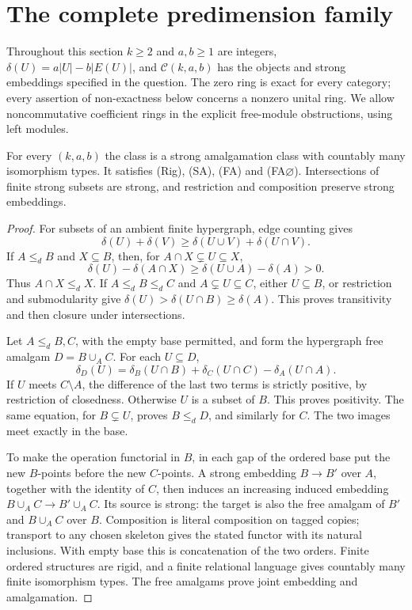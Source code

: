 \section{The complete predimension family}
\label{sec:D}
Throughout this section $k\geq2$ and $a,b\geq1$ are integers,
$\delta(U)=a|U|-b|E(U)|$, and $\mathcal C(k,a,b)$ has the objects
and strong embeddings specified in the question. The zero ring is exact
for every category; every assertion of non-exactness below concerns a
nonzero unital ring. We allow noncommutative coefficient rings in the
explicit free-module obstructions, using left modules.

\begin{proposition}
\label{D:closure}
For every $(k,a,b)$ the class is a strong amalgamation class with
countably many isomorphism types. It satisfies (Rig), (SA), (FA) and
(FA$\varnothing$). Intersections of finite strong subsets are strong,
and restriction and composition preserve strong embeddings.
\end{proposition}
\begin{proof}
For subsets of an ambient finite hypergraph, edge counting gives
\[
 \delta(U)+\delta(V)\geq\delta(U\cup V)+\delta(U\cap V).
\]
If $A\leq_d B$ and $X\subseteq B$, then, for
$A\cap X\subsetneq U\subseteq X$,
\[
 \delta(U)-\delta(A\cap X)
 \geq\delta(U\cup A)-\delta(A)>0.
\]
Thus $A\cap X\leq_d X$. If $A\leq_d B\leq_d C$ and
$A\subsetneq U\subseteq C$, either $U\subseteq B$, or restriction
and submodularity give
$\delta(U)>\delta(U\cap B)\geq\delta(A)$. This proves
transitivity and then closure under intersections.

Let $A\leq_d B,C$, with the empty base permitted, and form the
hypergraph free amalgam $D=B\cup_A C$. For each $U\subseteq D$,
\[
 \delta_D(U)=\delta_B(U\cap B)+\delta_C(U\cap C)
             -\delta_A(U\cap A).
\]
If $U$ meets $C\setminus A$, the difference of the last two terms is
strictly positive, by restriction of closedness. Otherwise $U$ is a
subset of $B$. This proves positivity. The same equation, for
$B\subsetneq U$, proves $B\leq_d D$, and similarly for $C$.
The two images meet exactly in the base.

To make the operation functorial in $B$, in each gap of the ordered
base put the new $B$-points before the new $C$-points. A strong
embedding $B\to B'$ over $A$, together with the identity of $C$,
then induces an increasing induced embedding
$B\cup_A C\to B'\cup_A C$. Its source is strong: the target is
also the free amalgam of $B'$ and $B\cup_A C$ over $B$.
Composition is literal composition on tagged copies; transport to
any chosen skeleton gives the stated functor with its natural
inclusions. With empty base this is concatenation of the two orders.
Finite ordered structures are rigid, and a finite relational language
gives countably many finite isomorphism types. The free amalgams prove
joint embedding and amalgamation.
\end{proof}

